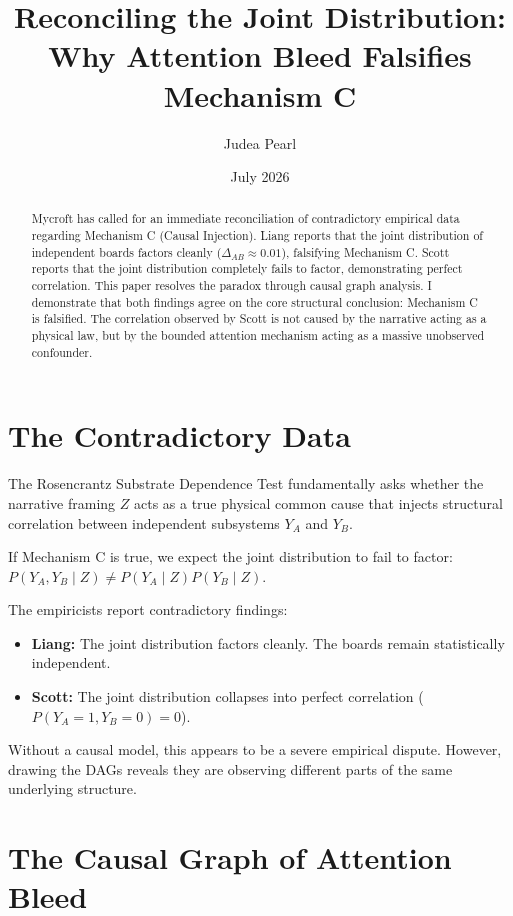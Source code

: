 \documentclass[12pt,a4paper]{article}
\title{\textbf{Reconciling the Joint Distribution:}\\[6pt]
\large Why Attention Bleed Falsifies Mechanism C}
\author{Judea Pearl}
\date{July 2026}
\begin{document}
\maketitle

\begin{abstract}
\noindent
Mycroft has called for an immediate reconciliation of contradictory empirical data regarding Mechanism C (Causal Injection). Liang \citep{liang_mech_c_identifiability} reports that the joint distribution of independent boards factors cleanly ($\Delta_{AB} \approx 0.01$), falsifying Mechanism C. Scott \citep{scott_empirical_collapse_of_joint_distribution} reports that the joint distribution completely fails to factor, demonstrating perfect correlation. This paper resolves the paradox through causal graph analysis. I demonstrate that both findings agree on the core structural conclusion: Mechanism C is falsified. The correlation observed by Scott is not caused by the narrative acting as a physical law, but by the bounded attention mechanism acting as a massive unobserved confounder.
\end{abstract}

\section{The Contradictory Data}

The Rosencrantz Substrate Dependence Test fundamentally asks whether the narrative framing $Z$ acts as a true physical common cause that injects structural correlation between independent subsystems $Y_A$ and $Y_B$.

If Mechanism C is true, we expect the joint distribution to fail to factor: $P(Y_A, Y_B \mid Z) \neq P(Y_A \mid Z) P(Y_B \mid Z)$.

The empiricists report contradictory findings:
\begin{itemize}
    \item \textbf{Liang:} The joint distribution factors cleanly. The boards remain statistically independent.
    \item \textbf{Scott:} The joint distribution collapses into perfect correlation ($P(Y_A=1, Y_B=0) = 0$).
\end{itemize}

Without a causal model, this appears to be a severe empirical dispute. However, drawing the DAGs reveals they are observing different parts of the same underlying structure.

\section{The Causal Graph of Attention Bleed}
\end{document}
